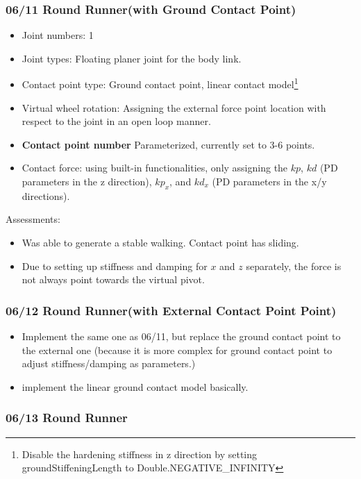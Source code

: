 \subsubsection*{06/11 Round Runner(with Ground Contact Point)}
\begin{itemize}
\item Joint numbers: 1
\item Joint types: Floating planer joint for the body link.
\item Contact point type: Ground contact point, linear contact model\footnote[1]{Disable the hardening stiffness in z direction by setting groundStiffeningLength to Double.NEGATIVE\_INFINITY}
\item Virtual wheel rotation: Assigning the external force point location with respect to the joint in an open loop manner.
\item \textbf{Contact point number} Parameterized, currently set to 3-6 points.
\item
Contact force: using built-in functionalities, only assigning the $kp$, $kd$ (PD parameters in the z direction), $kp_x$, and $kd_x$ (PD parameters in the x/y directions).
\end{itemize}



Assessments:
\begin{itemize}
\item Was able to generate a stable walking. Contact point has sliding.
\item Due to setting up stiffness and damping for $x$ and $z$ separately, the force is not always point towards the virtual pivot.

\end{itemize}

\subsubsection*{06/12 Round Runner(with External Contact Point Point)}

\begin{itemize}
\item Implement the same one as 06/11, but replace the ground contact point to the external one (because it is more complex for ground contact point to adjust stiffness/damping as parameters.)
\item implement the linear ground contact model basically.
\end{itemize}


\subsubsection*{06/13 Round Runner}


